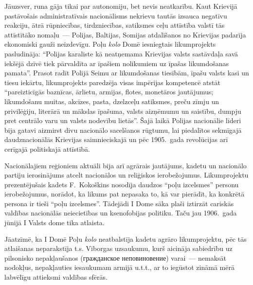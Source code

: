 \documentclass[twoside,a5paper,12pt,fleqn,openany]{extbook}
\newcommand{\pltxti}[1]{\textit{\textpolish{#1}}}
\newcommand{\rutxti}[1]{\textrussian{#1}}
\begin{document}
Jāuzsver, runa gāja tikai par autonomiju, bet nevis neatkarību. Kaut Krievijā pastāvošais administratīvais nacionālisms nekrievu tautās izsauca negatīvu reakciju, ātrā rūpniecības, tirdzniecības, satiksmes ceļu attīstība valstī tās attīstītāko nomaļu~--- Polijas, Baltijas, Somijas atdalīšanos no Krievijas padarīja ekonomiski gauži neizdevīgu. Poļu \pltxti{kolo} Domē iesniegtais likumprojekts pasludināja: ``Polijas karaliste kā neatņemama Krievijas valsts sastāvdaļa savā iekšējā dzīvē tiek pārvaldīta ar īpašiem nolikumiem uz īpašas likumdošanas pamata''. Prasot radīt Polijā Seimu ar likumdošanas tiesībām, īpašu valsts kasi un tiesu iekārtu, likumprojekts paredzēja visas impērijas kompetencē atstāt ``pareizticīgās baznīcas, ārlietu, armijas, flotes, monetāros jautājumus; likumdošanu muitas, akcīzes, pasta, dzelzceļu satiksmes, preču zīmju un privilēģiju, literārā un mākslas īpašuma, valsts aizņēmumu un saistību, dumpju pret centrālo varu un valsts nodevību lietās''. Šajā laikā Polijas nacionālie līderi bija gatavi aizmirst divu nacionālo sacelšanos rūgtumu, lai piedalītos sekmīgajā daudznacionālās Krievijas saimnieciskajā un pēc 1905.~gada revolūcijas arī cerīgajā politiskajā attīstībā.

Nacionālajiem reģioniem aktuāli bija arī agrārais jautājums, kadetu un nacionālo partiju ierosinājums atcelt nacionālos un reliģiskos ierobežojumus. Likumprojektu prezentējušais kadets F.~Kokoškins nosodīja daudzos ``poļu izcelsmes'' personu ierobežojumus, norādot, ka likums pat nepasaka to, kā var pierādīt, ka konkrētā persona ir tieši ``poļu izcelsmes''. Tādejādi I Dome sāka plaši iztirzāt cariskās valdības nacionālās neiecietības un ksenofobijas politiku. Taču jau 1906.~gada jūnijā I Valsts dome tika atlaista.

Jāatzīmē, ka I Domē Poļu \pltxti{kolo} neatbalstīja kadetu agrāro likumprojektu, pēc tās atlaišanas neparakstīja t.s. Viborgas uzsaukumu, kurš aicināja sabiedrību uz pilsonisko nepakļaušanos (\rutxti{гражданское неповиновение}) varai~--- nemaksāt nodokļus, nepakļauties iesaukumam armijā u.t.t., ar to iegūstot zināmā mērā labvēlīgu attieksmi valdības sfērās.
\end{document}
